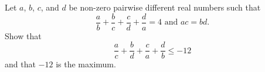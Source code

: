 \documentclass[varwidth]{standalone}
\begin{document}
    Let $a$, $b$, $c$, and $d$ be non-zero pairwise different real numbers such that
    \[
        \frac{a}{b} + \frac{b}{c} + \frac{c}{d} + \frac{d}{a} = 4 \text{ and } ac = bd.   
    \]
    Show that
    \[
        \frac{a}{c} + \frac{b}{d} + \frac{c}{a} + \frac{d}{b} \leq -12   
    \]
    and that $-12$ is the maximum.
\end{document}
